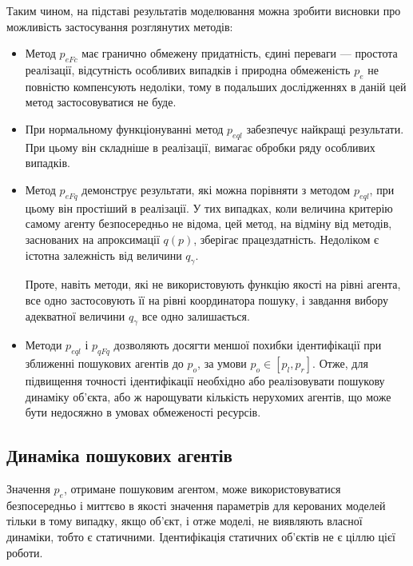 Таким чином, на підставі результатів моделювання можна зробити висновки про
можливість застосування розглянутих методів:


\begin{itemize}

  \item
    Метод $p_{eFc}$ має гранично  обмежену придатність,
    єдині переваги --- простота реалізації,
    відсутність особливих випадків і природна обмеженість
    $ p_e $ не повністю компенсують недоліки, тому в подальших
    дослідженнях в даній цей метод застосовуватися не буде.

  \item
    При нормальному функціонуванні метод $p_{eql}$ забезпечує найкращі
    результати. При цьому він складніше в реалізації, вимагає обробки ряду
    особливих випадків.

  \item
    Метод $p_{eFq}$ демонструє результати, які можна
    порівняти з методом $p_{eql}$, при цьому він простіший в реалізації. У тих
    випадках, коли величина критерію самому агенту безпосередньо не відома, цей
    метод, на відміну від методів, заснованих на апроксимації $q (p)$, зберігає
    працездатність. Недоліком є істотна залежність від величини $q_\gamma$.

    Проте, навіть методи, які не використовують функцію якості на
    рівні агента, все одно застосовують її на рівні координатора
    пошуку, і завдання вибору адекватної величини
    $ q_\gamma $ все одно залишається.

  \item
    Методи $p_{eql}$ і $p_{qFq}$ дозволяють досягти меншої похибки
    ідентифікації при зближенні пошукових агентів до $p_o$, за умови $p_o \in [p_l, p_r]$.
    Отже, для підвищення точності ідентифікації необхідно або
    реалізовувати пошукову динаміку об'єкта, або ж нарощувати
    кількість нерухомих агентів, що може бути недосяжно в умовах
    обмеженості ресурсів.


\end{itemize}





\subsection{Динаміка пошукових агентів}%

Значення $p_e$, отримане пошуковим агентом, може використовуватися
безпосередньо і миттєво в якості значення параметрів для керованих моделей
тільки в тому випадку, якщо об'єкт, і отже моделі, не виявляють власної
динаміки, тобто є статичними. Ідентифікація статичних об'єктів не є ціллю
цієї роботи.

